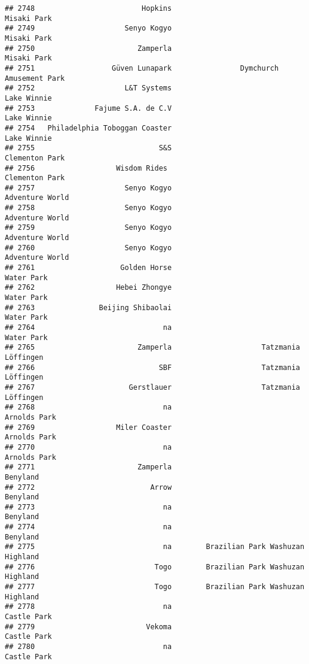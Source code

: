 \documentclass[
]{article}
\begin{document}
\begin{verbatim}
## 2748                         Hopkins                             Misaki Park
## 2749                     Senyo Kogyo                             Misaki Park
## 2750                        Zamperla                             Misaki Park
## 2751                  Güven Lunapark                Dymchurch Amusement Park
## 2752                     L&T Systems                             Lake Winnie
## 2753              Fajume S.A. de C.V                             Lake Winnie
## 2754   Philadelphia Toboggan Coaster                             Lake Winnie
## 2755                             S&S                          Clementon Park
## 2756                   Wisdom Rides                           Clementon Park
## 2757                     Senyo Kogyo                         Adventure World
## 2758                     Senyo Kogyo                         Adventure World
## 2759                     Senyo Kogyo                         Adventure World
## 2760                     Senyo Kogyo                         Adventure World
## 2761                    Golden Horse                              Water Park
## 2762                   Hebei Zhongye                              Water Park
## 2763               Beijing Shibaolai                              Water Park
## 2764                              na                              Water Park
## 2765                        Zamperla                     Tatzmania Löffingen
## 2766                             SBF                     Tatzmania Löffingen
## 2767                      Gerstlauer                     Tatzmania Löffingen
## 2768                              na                            Arnolds Park
## 2769                   Miler Coaster                            Arnolds Park
## 2770                              na                            Arnolds Park
## 2771                        Zamperla                                Benyland
## 2772                           Arrow                                Benyland
## 2773                              na                                Benyland
## 2774                              na                                Benyland
## 2775                              na        Brazilian Park Washuzan Highland
## 2776                            Togo        Brazilian Park Washuzan Highland
## 2777                            Togo        Brazilian Park Washuzan Highland
## 2778                              na                             Castle Park
## 2779                          Vekoma                             Castle Park
## 2780                              na                             Castle Park

\end{verbatim}
\end{document}
